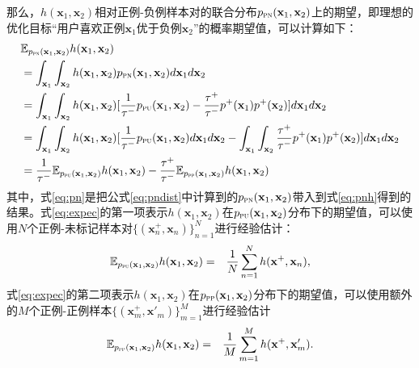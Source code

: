 那么，$h(\mathbf x_1,\mathbf x_2)$相对正例-负例样本对的联合分布$p_\textsc{pn}(\mathbf{x}_1, \mathbf{x}_2)$上的期望，即理想的优化目标“用户喜欢正例$\mathbf{x}_1$优于负例$\mathbf{x}_2$”的概率期望值，可以计算如下：
\begin{align}
	&\mathbb{E}_{ p_\textsc{pn}(\mathbf{x}_1, \mathbf{x}_2)} h(\mathbf{x}_1,\mathbf{x}_2)\\
	&= \int_{\mathbf{x}_1}\int_{\mathbf{x}_2}   h(\mathbf{x}_1,\mathbf{x}_2) p_\textsc{pn}(\mathbf{x}_1, \mathbf{x}_2) d{\mathbf{x}_1}d{\mathbf{x}_2}\label{eq:pnh} \\
	&=\int_{\mathbf{x}_1}\int_{\mathbf{x}_2}   h(\mathbf{x}_1,\mathbf{x}_2) [\frac{1}{\tau^-}p_{\textsc{pu}}(\mathbf{x}_1, \mathbf{x}_2)- \frac{\tau^+}{\tau^-}p^+( \mathbf{x}_1) p^+(\mathbf x_2)]d{\mathbf{x}_1}d{\mathbf{x}_2} \label{eq:pn}\\
	&=\int_{\mathbf{x}_1}\int_{\mathbf{x}_2}   h(\mathbf{x}_1,\mathbf{x}_2) [\frac{1}{\tau^-}p_{\textsc{pu}}(\mathbf{x}_1, \mathbf{x}_2) d{\mathbf{x}_1}d{\mathbf{x}_2}- \int_{\mathbf{x}_1}\int_{\mathbf{x}_2} \frac{\tau^+}{\tau^-}p^+( \mathbf{x}_1) p^+(\mathbf x_2)]d{\mathbf{x}_1}d{\mathbf{x}_2} \\
	&= \frac{1}{\tau^-}\mathbb{E}_{ p_\textsc{pu}(\mathbf{x}_1, \mathbf{x}_2)} h(\mathbf{x}_1,\mathbf{x}_2) -\frac{\tau^+}{\tau^-} \mathbb{E}_{ p_\textsc{pp}(\mathbf{x}_1, \mathbf{x}_2)} h(\mathbf{x}_1,\mathbf{x}_2) \label{eq:expec}
\end{align}
其中，式\eqref{eq:pn}是把公式\eqref{eq:pndist}中计算到的$p_\textsc{pn}(\mathbf{x}_1, \mathbf{x}_2)$带入到式\eqref{eq:pnh}得到的结果。式\eqref{eq:expec}的第一项表示$ h(\mathbf{x}_1,\mathbf{x}_2)$在$ p_\textsc{pu}(\mathbf{x}_1, \mathbf{x}_2)$分布下的期望值，可以使用$N$个正例-未标记样本对$\{(\mathbf{x}^+_n,\mathbf{x}_n)\}_{n=1}^N$进行经验估计：
\begin{eqnarray}
	\mathbb{E}_{ p_\textsc{pu}(\mathbf{x}_1, \mathbf{x}_2)} h(\mathbf{x}_1,\mathbf{x}_2) &=& \frac{1}{N} \sum_{n=1}^{N} h(\mathbf{x}^+,\mathbf{x}_n)\label{eq:epu},
\end{eqnarray}
式\eqref{eq:expec}的第二项表示$ h(\mathbf{x}_1,\mathbf{x}_2)$在$ p_\textsc{pp}(\mathbf{x}_1, \mathbf{x}_2)$分布下的期望值，可以使用额外的$M$个正例-正例样本$\{(\mathbf{x}^+_m,\mathbf{x}'_m)\}_{m=1}^M$进行经验估计
\begin{eqnarray}
	\mathbb{E}_{ p_\textsc{pp}(\mathbf{x}_1, \mathbf{x}_2)} h(\mathbf{x}_1,\mathbf{x}_2)  &=& \frac{1}{M} \sum_{m=1}^{M} h(\mathbf{x}^+,\mathbf{x}_m^{\prime})\label{eq:epp}.
\end{eqnarray}

